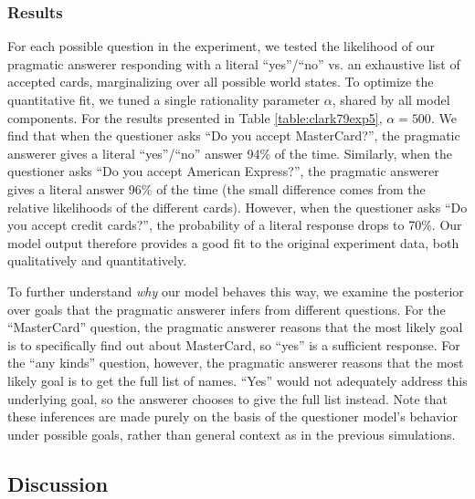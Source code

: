 \documentclass[12pt, floatsintext, jou]{apa6}
\begin{document}
%

\subsubsection{Results}

For each possible question in the experiment, we tested the likelihood of our pragmatic answerer responding with a literal ``yes''/``no'' vs. an exhaustive list of accepted cards, marginalizing over all possible world states. To optimize the quantitative fit, we tuned a single rationality parameter $\alpha$, shared by all model components. For the results presented in Table \ref{table:clark79exp5}, $\alpha = 500$. We find that when the questioner asks ``Do you accept MasterCard?'', the pragmatic answerer gives a literal ``yes''/``no'' answer 94\% of the time. Similarly, when the questioner asks ``Do you accept American Express?'', the pragmatic answerer gives a literal answer 96\% of the time (the small difference comes from the relative likelihoods of the different cards). However, when the questioner asks ``Do you accept credit cards?'', the probability of a literal response drops to 70\%. Our model output therefore provides a good fit to the original experiment data, both qualitatively and quantitatively.

To further understand \emph{why} our model behaves this way, we examine the posterior over goals that the pragmatic answerer infers from different questions.  For the ``MasterCard'' question, the pragmatic answerer reasons that the most likely goal is to specifically find out about MasterCard, so ``yes'' is a sufficient response. For the ``any kinds'' question, however, the pragmatic answerer reasons that the most likely goal is to get the full list of names. ``Yes'' would not adequately address this underlying goal, so the answerer chooses to give the full list instead. Note that these inferences are made purely on the basis of the questioner model's behavior under possible goals, rather than general context as in the previous simulations.

\subsection{Discussion}
\end{document}
